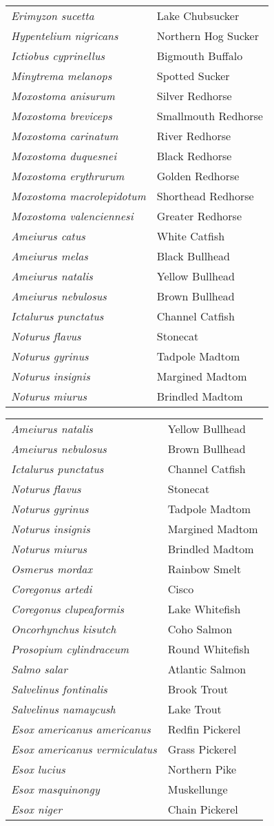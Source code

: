 \documentclass[11pt]{article}
\begin{document}
\vspace{\baselineskip}

%
\textbf{\Student}

\begin{tabular}{@{}L{3in}L{3in}@{}}
\textit{Erimyzon sucetta} & Lake Chubsucker\tabularnewline
\textit{Hypentelium nigricans} & Northern Hog Sucker\tabularnewline
\textit{Ictiobus cyprinellus} & Bigmouth Buffalo\tabularnewline
\textit{Minytrema melanops} & Spotted Sucker\tabularnewline
\textit{Moxostoma anisurum} & Silver Redhorse\tabularnewline
\textit{Moxostoma breviceps} & Smallmouth Redhorse\tabularnewline
\textit{Moxostoma carinatum} & River Redhorse\tabularnewline
\textit{Moxostoma duquesnei} & Black Redhorse\tabularnewline
\textit{Moxostoma erythrurum} & Golden Redhorse\tabularnewline
\textit{Moxostoma macrolepidotum} & Shorthead Redhorse\tabularnewline
\textit{Moxostoma valenciennesi} & Greater Redhorse\tabularnewline
\textit{Ameiurus catus} & White Catfish\tabularnewline
\textit{Ameiurus melas} & Black Bullhead\tabularnewline
\textit{Ameiurus natalis} & Yellow Bullhead\tabularnewline
\textit{Ameiurus nebulosus} & Brown Bullhead\tabularnewline
\textit{Ictalurus punctatus} & Channel Catfish\tabularnewline
\textit{Noturus flavus} & Stonecat\tabularnewline
\textit{Noturus gyrinus} & Tadpole Madtom\tabularnewline
\textit{Noturus insignis} & Margined Madtom\tabularnewline
\textit{Noturus miurus} & Brindled Madtom\tabularnewline
\end{tabular}

\newpage

\vspace{\baselineskip}

%
\textbf{\Student}

\begin{tabular}{@{}L{3in}L{3in}@{}}
\textit{Ameiurus natalis} & Yellow Bullhead\tabularnewline
\textit{Ameiurus nebulosus} & Brown Bullhead\tabularnewline
\textit{Ictalurus punctatus} & Channel Catfish\tabularnewline
\textit{Noturus flavus} & Stonecat\tabularnewline
\textit{Noturus gyrinus} & Tadpole Madtom\tabularnewline
\textit{Noturus insignis} & Margined Madtom\tabularnewline
\textit{Noturus miurus} & Brindled Madtom\tabularnewline
\textit{Osmerus mordax} & Rainbow Smelt\tabularnewline
\textit{Coregonus artedi} & Cisco\tabularnewline
\textit{Coregonus clupeaformis} & Lake Whitefish\tabularnewline
\textit{Oncorhynchus kisutch} & Coho Salmon\tabularnewline
\textit{Prosopium cylindraceum} & Round Whitefish\tabularnewline
\textit{Salmo salar} & Atlantic Salmon\tabularnewline
\textit{Salvelinus fontinalis} & Brook Trout\tabularnewline
\textit{Salvelinus namaycush} & Lake Trout\tabularnewline
\textit{Esox americanus americanus} & Redfin Pickerel\tabularnewline
\textit{Esox americanus vermiculatus} & Grass Pickerel\tabularnewline
\textit{Esox lucius} & Northern Pike\tabularnewline
\textit{Esox masquinongy} & Muskellunge\tabularnewline
\textit{Esox niger} & Chain Pickerel\tabularnewline
\end{tabular}
\end{document}
